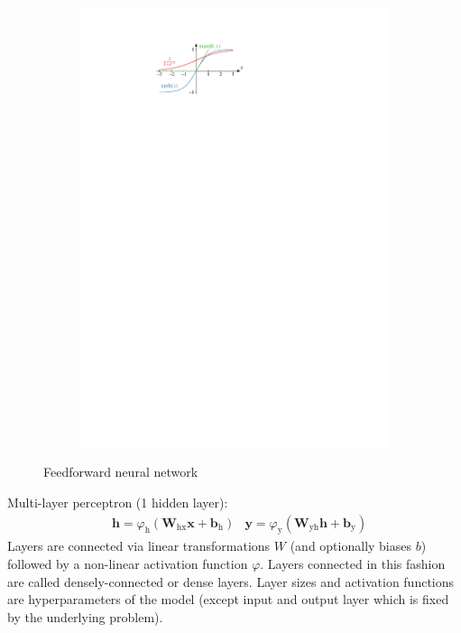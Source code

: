 \begin{figure}[ht]
\begin{subfigure}[t]{0.4\textwidth}
    \includegraphics{./figures/theory/activation_functions.pdf}
    \label{fig:activation_functions}
  \end{subfigure}
  \caption{Feedforward neural network}
\end{figure}

Multi-layer perceptron (1 hidden layer):
\begin{align*}
  &\mathbf{h} = \varphi_{\text{h}}(\mathbf{W}_{\text{hx}} \mathbf{x} + \mathbf{b}_{\text{h}})
  &\mathbf{y} = \varphi_{\text{y}}(\mathbf{W}_{\text{yh}} \mathbf{h} + \mathbf{b}_{\text{y}})
\end{align*}
Layers are connected via linear transformations $W$ (and optionally biases $b$)
followed by a non-linear activation function $\varphi$. Layers connected in this
fashion are called densely-connected or dense layers. Layer sizes and activation
functions are hyperparameters of the model (except input and output layer which
is fixed by the underlying problem).

